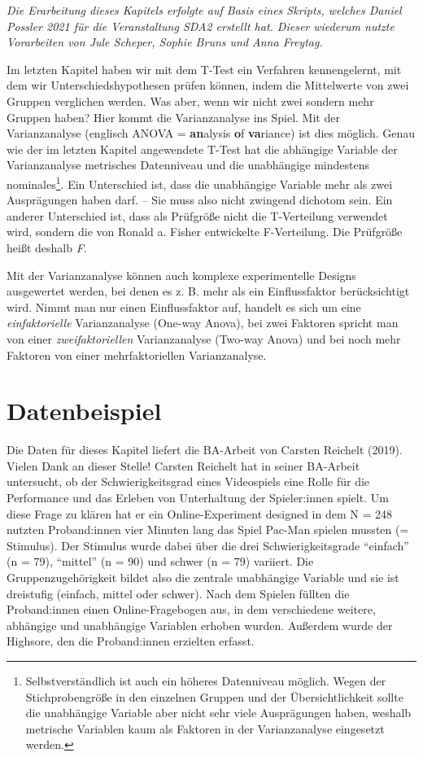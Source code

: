 \documentclass[
]{book}
\begin{document}
\emph{Die Erarbeitung dieses Kapitels erfolgte auf Basis eines Skripts, welches Daniel Possler 2021 für die Veranstaltung SDA2 erstellt hat. Dieser wiederum nutzte Vorarbeiten von Jule Scheper, Sophie Bruns und Anna Freytag.}

Im letzten Kapitel haben wir mit dem T-Test ein Verfahren kennengelernt, mit dem wir Unterschiedshypothesen prüfen können, indem die Mittelwerte von zwei Gruppen verglichen werden. Was aber, wenn wir nicht zwei sondern mehr Gruppen haben? Hier kommt die Varianzanalyse ins Spiel. Mit der Varianzanalyse (englisch ANOVA = \textbf{an}alysis \textbf{o}f \textbf{va}riance) ist dies möglich. Genau wie der im letzten Kapitel angewendete T-Test hat die abhängige Variable der Varianzanalyse metrisches Datenniveau und die unabhängige mindestens nominales\footnote{Selbstverständlich ist auch ein höheres Datenniveau möglich. Wegen der Stichprobengröße in den einzelnen Gruppen und der Übersichtlichkeit sollte die unabhängige Variable aber nicht sehr viele Ausprägungen haben, weshalb metrische Variablen kaum als Faktoren in der Varianzanalyse eingesetzt werden.}. Ein Unterschied ist, dass die unabhängige Variable mehr als zwei Ausprägungen haben darf. -- Sie muss also nicht zwingend dichotom sein. Ein anderer Unterschied ist, dass als Prüfgröße nicht die T-Verteilung verwendet wird, sondern die von Ronald a. Fisher entwickelte F-Verteilung. Die Prüfgröße heißt deshalb \emph{F}.

Mit der Varianzanalyse können auch komplexe experimentelle Designs ausgewertet werden, bei denen es z. B. mehr als ein Einflussfaktor berücksichtigt wird. Nimmt man nur einen Einflussfaktor auf, handelt es sich um eine \emph{einfaktorielle} Varianzanalyse (One-way Anova), bei zwei Faktoren spricht man von einer \emph{zweifaktoriellen} Varianzanalyse (Two-way Anova) und bei noch mehr Faktoren von einer mehrfaktoriellen Varianzanalyse.

\hypertarget{datenbeispiel-1}{%
\section{Datenbeispiel}\label{datenbeispiel-1}}

Die Daten für dieses Kapitel liefert die BA-Arbeit von Carsten Reichelt (2019). Vielen Dank an dieser Stelle! Carsten Reichelt hat in seiner BA-Arbeit untersucht, ob der Schwierigkeitsgrad eines Videospiels eine Rolle für die Performance und das Erleben von Unterhaltung der Spieler:innen spielt. Um diese Frage zu klären hat er ein Online-Experiment designed in dem N = 248 nutzten Proband:innen vier Minuten lang das Spiel Pac-Man spielen mussten (= Stimulus). Der Stimulus wurde dabei über die drei Schwierigkeitsgrade ``einfach'' (n = 79), ``mittel'' (n = 90) und schwer (n = 79) variiert. Die Gruppenzugehörigkeit bildet also die zentrale unabhängige Variable und sie ist dreistufig (einfach, mittel oder schwer). Nach dem Spielen füllten die Proband:innen einen Online-Fragebogen aus, in dem verschiedene weitere, abhängige und unabhängige Variablen erhoben wurden. Außerdem wurde der Highsore, den die Proband:innen erzielten erfasst.
\end{document}
